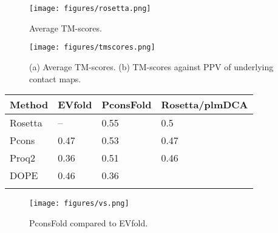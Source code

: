 \documentclass{bioinfo}
\begin{document}
\begin{figure}[!tpb]%
    \centerline{\texttt{[image: figures/rosetta.png]}}
\caption{Average TM-scores.}\label{fig:ros}
\end{figure}

\begin{figure}[!tpb]%
    \centerline{\texttt{[image: figures/tmscores.png]}}
\caption{(a) Average TM-scores. (b) TM-scores against PPV of underlying contact maps.}\label{fig:main}
\end{figure}

\begin{table}[!t]
{\begin{tabular}{llll}\toprule
    Method  & EVfold & PconsFold & Rosetta/plmDCA \\ \midrule
    Rosetta & --     & 0.55     & 0.5          \\
    Pcons   & 0.47  & 0.53     & 0.47          \\
    Proq2   & 0.36  & 0.51     & 0.46          \\
    DOPE    & 0.46  & 0.36     & ~              \\ \botrule
\end{tabular}}{}
\end{table}

\begin{figure}[!tpb]%
    \centerline{\texttt{[image: figures/vs.png]}}
\caption{PconsFold compared to EVfold.}\label{fig:vs}
\end{figure}
\end{document}
